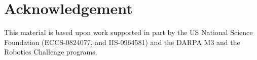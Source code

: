 \documentclass{ws-ijhr}
\begin{document}

\section*{Acknowledgement}
This material is based upon work supported in part by the US National Science 
Foundation (ECCS-0824077, and IIS-0964581) and the DARPA M3 and the Robotics 
Challenge programs.
 



\end{document}
